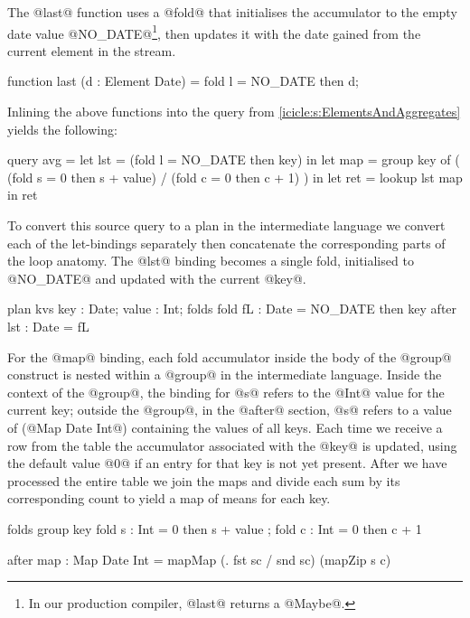 The @last@ function uses a @fold@ that initialises the accumulator to the empty date value @NO_DATE@\footnote{In our production compiler, @last@ returns a @Maybe@.}, then updates it with the date gained from the current element in the stream.
\begin{icicle}
function last (d : Element Date)
 = fold l = NO_DATE then d;
\end{icicle}



Inlining the above functions into the query from \cref{icicle:s:ElementsAndAggregates} yields the following:
\begin{icicle}
query avg
 =    let lst = (fold l = NO_DATE then key)
   in let map = group key of
                ( (fold s = 0 then s + value)
                / (fold c = 0 then c + 1) )
   in let ret = lookup lst map
   in     ret
\end{icicle}

To convert this source query to a plan in the intermediate language we convert each of the let-bindings separately then concatenate the corresponding parts of the loop anatomy.
The @lst@ binding becomes a single fold, initialised to @NO_DATE@ and updated with the current @key@.
\begin{icicle-core}
plan kvs {      key : Date; value : Int;       }
folds    { fold fL  : Date = NO_DATE then key  }
after    {      lst : Date = fL                }
\end{icicle-core}

For the @map@ binding, each fold accumulator inside the body of the @group@ construct is nested within a @group@ in the intermediate language.
Inside the context of the @group@, the binding for @s@ refers to the @Int@ value for the current key; outside the @group@, in the @after@ section, @s@ refers to a value of (@Map Date Int@) containing the values of all keys.
Each time we receive a row from the table the accumulator associated with the @key@ is updated, using the default value @0@ if an entry for that key is not yet present.
After we have processed the entire table we join the maps and divide each sum by its corresponding count to yield a map of means for each key.
\begin{icicle-core}
folds  { group key
          { fold s : Int = 0 then s + value
          ; fold c : Int = 0 then c + 1 } }

after  { map : Map Date Int
          = mapMap (\sc. fst sc / snd sc) (mapZip s c) }
\end{icicle-core}

